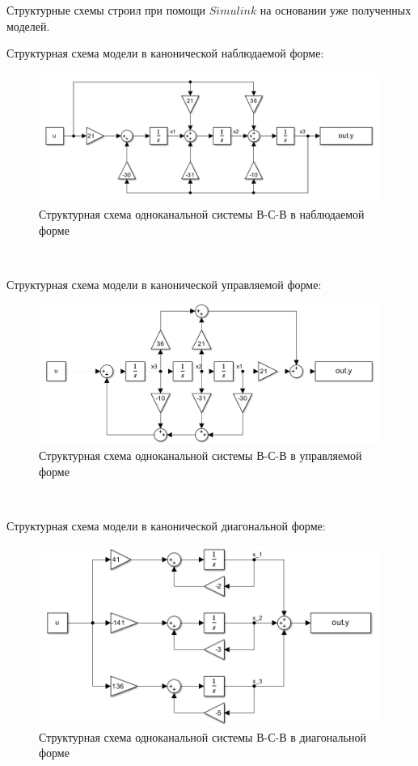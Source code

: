 \documentclass[a4paper]{article}
\begin{document}
Структурные схемы строил при помощи $Simulink$ на основании уже полученных моделей.\ 

Структурная схема модели в канонической наблюдаемой форме:

\begin{figure}[H]
    \centering
    \includegraphics[width=0.75\linewidth]{ex2/scheme_observable.png}
    \caption{Структурная схема одноканальной системы В-С-В в наблюдаемой форме}
\end{figure}\

Структурная схема модели в канонической управляемой форме:

\begin{figure}[H]
    \centering
    \includegraphics[width=0.75\linewidth]{ex2/scheme_controlable.png}
    \caption{Структурная схема одноканальной системы В-С-В в управляемой форме}
\end{figure}\

Структурная схема модели в канонической диагональной форме:

\begin{figure}[H]
    \centering
    \includegraphics[width=0.75\linewidth]{ex2/scheme_diagonal.png}
    \caption{Структурная схема одноканальной системы В-С-В в диагональной форме}
\end{figure}\
\end{document}
